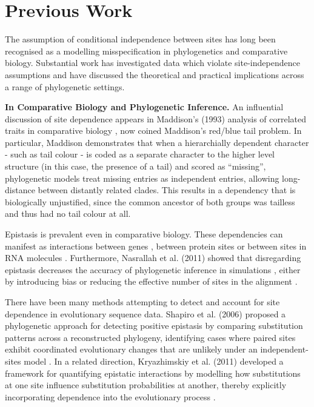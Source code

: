 \section{Previous Work}
The assumption of conditional independence between sites has long been recognised as a modelling misspecification in phylogenetics and comparative biology. Substantial work has investigated data which violate site-independence assumptions and have discussed the theoretical and practical implications across a range of phylogenetic settings.

\textbf{In Comparative Biology and Phylogenetic Inference.}
An influential discussion of site dependence appears in Maddison's (1993) analysis of correlated traits in comparative biology \cite{Maddison1993}, now coined Maddison's red/blue tail problem. In particular, Maddison demonstrates that when a hierarchially dependent character - such as tail colour - is coded as a separate character to the higher level structure (in this case, the presence of a tail) and scored as ``missing'', phylogenetic models treat missing entries as independent entries, allowing long-distance between distantly related clades. This results in a dependency that is biologically unjustified, since the common ancestor of both groups was tailless and thus had no tail colour at all. 

Epistasis is prevalent even in comparative biology. These dependencies can manifest as interactions between genes \cite{Cohen2012}, between protein sites \cite{Dimmic2005, Kryazhimskiy2011} or between sites in RNA molecules \cite{Shapiro2006, Meyer2019, Golden2020}. Furthermore, Nasrallah et al. (2011) showed that disregarding epistasis decreases the accuracy of phylogenetic inference in simulations \cite{Nasrallah2011}, either by introducing bias or reducing the effective number of sites in the alignment \cite{Magee2021}.

There have been many methods attempting to detect and account for site dependence in evolutionary sequence data. Shapiro et al. (2006) proposed a phylogenetic approach for detecting positive epistasis by comparing substitution patterns across a reconstructed phylogeny, identifying cases where paired sites exhibit coordinated evolutionary changes that are unlikely under an independent-sites model \cite{Shapiro2006}. In a related direction, Kryazhimskiy et al. (2011) developed a framework for quantifying epistatic interactions by modelling how substitutions at one site influence substitution probabilities at another, thereby explicitly incorporating dependence into the evolutionary process \cite{Kryazhimskiy2011}.

